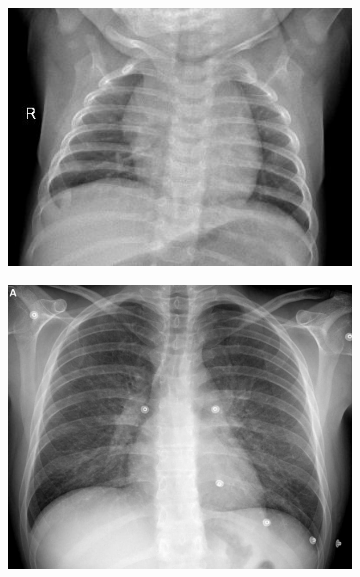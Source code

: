 \documentclass[conference]{IEEEtran}
\begin{document}
\begin{figure}[htp]
    \centering
    \begin{subfigure}[b]{0.35\textwidth}
         \centering
         \includegraphics[width=\textwidth]{imgs/Normal (1).jpg}
         \caption{}
         \label{fig:example_normal}
     \end{subfigure}
     \hfill
     \begin{subfigure}[b]{0.35\textwidth}
         \centering
         \includegraphics[width=\textwidth]{imgs/COVID-19 (1).jpg}
         \caption{}
         \label{fig:example_covid19}
     \end{subfigure}

\end{figure}
\end{document}
